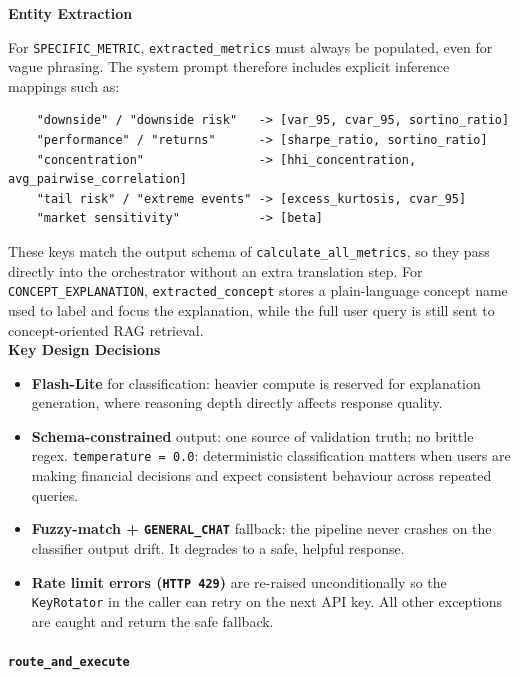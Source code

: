 \textbf{Entity Extraction}

For \texttt{SPECIFIC\_METRIC}, \texttt{extracted\_metrics} must always be populated, even for vague phrasing. The system prompt therefore includes explicit inference mappings such as:

\begin{lstlisting}
    "downside" / "downside risk"   -> [var_95, cvar_95, sortino_ratio]
    "performance" / "returns"      -> [sharpe_ratio, sortino_ratio]
    "concentration"                -> [hhi_concentration, avg_pairwise_correlation]
    "tail risk" / "extreme events" -> [excess_kurtosis, cvar_95]
    "market sensitivity"           -> [beta]
\end{lstlisting}

These keys match the output schema of \texttt{calculate\_all\_metrics}, so they pass directly into the orchestrator without an extra translation step. For \texttt{CONCEPT\_EXPLANATION}, \texttt{extracted\_concept} stores a plain-language concept name used to label and focus the explanation, while the full user query is still sent to concept-oriented RAG retrieval.\\

\textbf{Key Design Decisions}
\begin{itemize}
    \item \textbf{Flash-Lite} for classification: heavier compute is reserved for explanation generation, where reasoning depth directly affects response quality.
    \item \textbf{Schema-constrained} output: one source of validation truth; no brittle regex. \texttt{temperature = 0.0}: deterministic classification matters when users are making financial decisions and expect consistent behaviour across repeated queries.
    \item \textbf{Fuzzy-match + \texttt{GENERAL\_CHAT}} fallback: the pipeline never crashes on the classifier output drift. It degrades to a safe, helpful response.
    \item \textbf{Rate limit errors (\texttt{HTTP 429})} are re-raised unconditionally so the \texttt{KeyRotator} in the caller can retry on the next API key. All other exceptions are caught and return the safe fallback.
\end{itemize}


\paragraph{\texttt{route\_and\_execute}}

